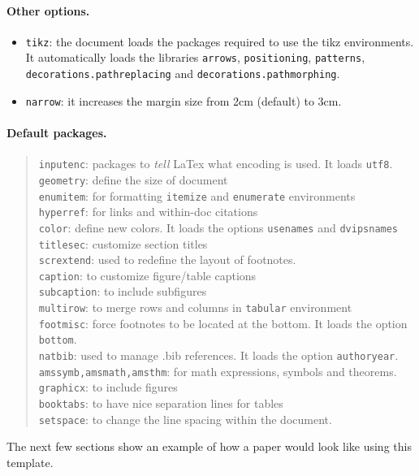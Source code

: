 \documentclass[12pt]{bppaper}
\begin{document}
\paragraph{Other options.}
\begin{itemize}
\item \texttt{tikz}: the document loads the packages required to use the tikz environments. It automatically loads the libraries \texttt{arrows}, \texttt{positioning}, \texttt{patterns}, \texttt{decorations.pathreplacing} and \texttt{decorations.pathmorphing}.
\item \texttt{narrow}: it increases the margin size from 2cm (default) to 3cm.
\end{itemize}

\paragraph{Default packages.}
\begin{quote}
\texttt{inputenc}: packages to \textit{tell} LaTex what encoding is used. It loads \texttt{utf8}. \\
\texttt{geometry}: define the size of document\\
\texttt{enumitem}: for formatting \texttt{itemize} and \texttt{enumerate} environments\\
\texttt{hyperref}: for links and within-doc citations\\
\texttt{color}: define new colors. It loads the options \texttt{usenames} and \texttt{dvipsnames}\\
\texttt{titlesec}: customize section titles\\
\texttt{scrextend}: used to redefine the layout of footnotes.\\
\texttt{caption}: to customize figure/table captions\\
\texttt{subcaption}: to include subfigures\\
\texttt{multirow}: to merge rows and columns in \texttt{tabular} environment\\
\texttt{footmisc}: force footnotes to be located at the bottom. It loads the option \texttt{bottom}.\\
\texttt{natbib}: used to manage .bib references. It loads the option \texttt{authoryear}.\\
\texttt{amssymb,amsmath,amsthm}: for math expressions, symbols and theorems.\\
\texttt{graphicx}: to include figures\\
\texttt{booktabs}: to have nice separation lines for tables\\
\texttt{setspace}: to change the line spacing within the document.
\end{quote}
The next few sections show an example of how a paper would look like using this template.
\end{document}
